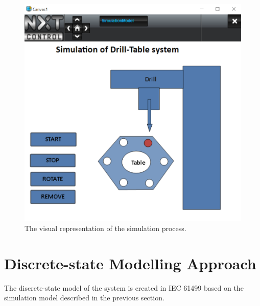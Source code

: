 \begin{bibunit}
\begin{figure}
    \centering
    \includegraphics[scale = 0.30]{MX_Papers/Paper2/images/DT_HMI5.PNG}
    \caption{The visual representation of the simulation process.}
    \label{figure:SimulationDiagram}
\end{figure}

\section{Discrete-state Modelling Approach}

The discrete-state model of the system is created in IEC 61499 based on the simulation model described in the previous section. 




\end{bibunit}
